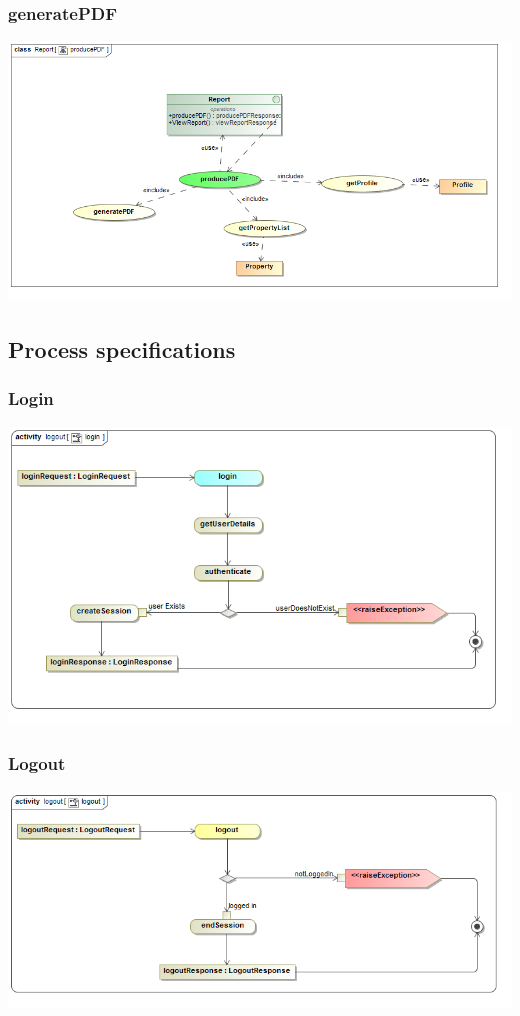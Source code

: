 \documentclass[a4paper,12pt]{article}
\begin{document}
\subsubsection{generatePDF}
\includegraphics[width=1\textwidth]{./Images/newDiagrams/requiredFunctionality/Sandile/producePDFFR.png}




\subsection{Process specifications}
\subsubsection{Login}
\includegraphics[width=1\textwidth]{./Images/newDiagrams/processSpecification/Diana/login.png}
\subsubsection{Logout}
\includegraphics[width=1\textwidth]{./Images/newDiagrams/processSpecification/Diana/logout.png}
\end{document}
